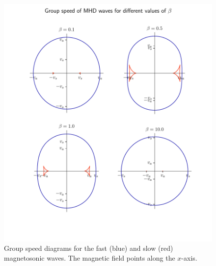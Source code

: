\begin{figure}[H]
	\centering
	\includegraphics[width=\linewidth]{images/MHD-group-speed.pdf}
	\caption{Group speed diagrams for the fast (blue) and slow (red) magnetosonic waves. The magnetic field points along the $x$-axis.}
	\label{fig:MHD-group-speed}
\end{figure}

